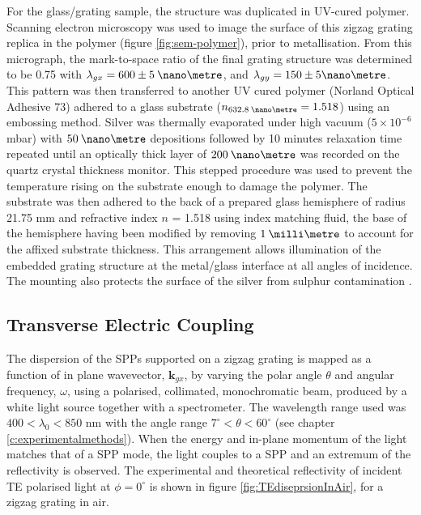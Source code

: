 For the glass/grating sample, the structure was duplicated in UV-cured polymer. Scanning electron microscopy was used to image the surface of this zigzag grating  replica in the polymer (figure \ref{fig:sem-polymer}), prior to metallisation. From this micrograph, the mark-to-space ratio of the final grating structure was determined to be 0.75 with ${\lambda_{gx} = 600 \pm 5 \:\nano\metre}$, and ${\lambda_{gy} = 150 \pm 5 \nano\metre}$. This pattern was then transferred to another UV cured polymer (Norland Optical Adhesive 73) adhered to a glass substrate (${n_{632.8 \:\nano\metre} = 1.518}$) using an embossing method.
Silver was thermally evaporated under high vacuum ($5 \times 10^{-6}$ mbar) with ${50 \:\nano\metre}$ depositions followed by 10 minutes relaxation time repeated until an optically thick layer of ${200\:\nano\metre}$ was recorded on the quartz crystal thickness monitor. This stepped procedure was used to prevent the temperature rising on the substrate enough to damage the polymer.
The substrate was then adhered to the back of a prepared glass hemisphere of radius 21.75 mm and refractive index $n$ = 1.518 using index matching fluid, the base of the hemisphere having been modified by removing ${1 \:\milli\metre}$ to account for the affixed substrate thickness. This arrangement allows illumination of the embedded grating structure at the metal/glass interface at all angles of incidence. The mounting also protects the surface of the silver from sulphur contamination \cite{Kovacs1978}.

\subsection{Transverse Electric Coupling\label{sec:TEexciatation}}

The dispersion of the SPPs supported on a zigzag grating is mapped as a function of in plane wavevector, $\mathbf{k}_{gx}$, by varying the polar angle $\theta$ and angular frequency, $\omega$, using a polarised, collimated, monochromatic beam, produced by a white light source together with a spectrometer. The wavelength range used was $400 < \lambda_0 < 850$ nm with the angle range $7^\circ<\theta<60^\circ$ (see chapter \ref{c:experimentalmethods}). When the energy and in-plane momentum of the light matches that of a SPP mode, the light couples to a SPP and an extremum of the reflectivity is observed. The experimental and theoretical reflectivity of incident TE polarised light at $\phi = 0^\circ$ is shown in figure \ref{fig:TEdiseprsionInAir}, for a zigzag grating in air. 

